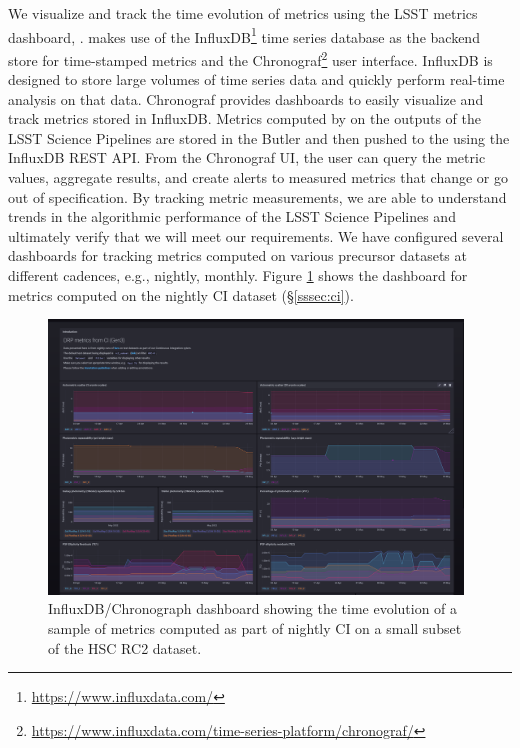 We visualize and track the time evolution of \faro metrics using the LSST metrics dashboard, \squash\cite{SQR-009}.
\squash makes use of the InfluxDB\footnote{\url{https://www.influxdata.com/}} time series database as the backend store for time-stamped metrics and the Chronograf\footnote{\url{https://www.influxdata.com/time-series-platform/chronograf/}} user interface.
InfluxDB is designed to store large volumes of time series data and quickly perform real-time analysis on that data.
Chronograf provides dashboards to easily visualize and track metrics stored in InfluxDB.
Metrics computed by \faro on the outputs of the LSST Science Pipelines are stored in the Butler and then pushed to the \squash using the InfluxDB REST API.
From the Chronograf UI, the user can query the metric values, aggregate results, and create alerts to measured metrics that change or go out of specification.
By tracking metric measurements, we are able to understand trends in the algorithmic performance of the LSST Science Pipelines and ultimately verify that we will meet our requirements.
We have configured several dashboards for tracking \faro metrics computed on various precursor datasets at different cadences, e.g., nightly, monthly.
Figure \ref{fig:squash_metrics_ci} shows the dashboard for \faro metrics computed on the nightly CI dataset (\S \ref{sssec:ci}). 
\begin{figure}[!htp]
  \par\medskip 
  \includegraphics[width=0.98\textwidth]{figures/squash-dashboard-ci.png}
  \par\medskip   
  \caption{InfluxDB/Chronograph dashboard showing the time evolution of a sample of metrics computed as part of nightly CI on a small subset of the HSC RC2 dataset.}
  \label{fig:squash_metrics_ci}
\end{figure}


